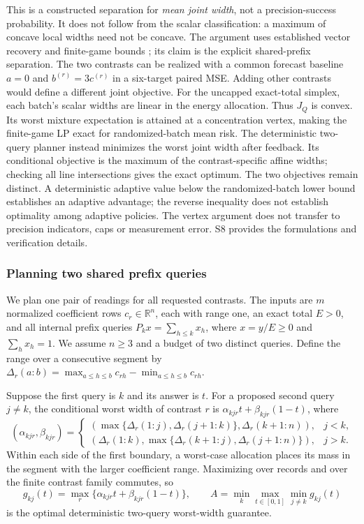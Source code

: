 \documentclass[12pt]{article}
\begin{document}
This is a constructed separation for \emph{mean joint width}, not a
precision-success probability.  It does not follow from the scalar
classification: a maximum of concave local widths need not be concave.
The argument uses established vector recovery and finite-game bounds
\citep{krieg2025}; its claim is the explicit shared-prefix separation.
The two contrasts can be realized with a common forecast baseline
$a=0$ and $b^{(r)}=3c^{(r)}$ in a six-target paired MSE.  Adding other
contrasts would define a different joint objective.
For the uncapped exact-total simplex, each batch's scalar widths are
linear in the energy allocation. Thus $J_Q$ is convex. Its worst mixture
expectation is attained at a concentration vertex, making the finite-game
LP exact for randomized-batch mean risk. The deterministic two-query
planner instead minimizes the worst joint width after feedback. Its
conditional objective is the maximum of the contrast-specific affine
widths; checking all line intersections gives the exact optimum.
The two objectives remain distinct. A deterministic adaptive value below
the randomized-batch lower bound establishes an adaptive advantage; the
reverse inequality does not establish optimality among adaptive policies.
The vertex argument does not transfer to precision indicators, caps or
measurement error. S8 provides the formulations and verification details.
\subsubsection{Planning two shared prefix queries}
\label{sec:shared-planner-algorithm}
We plan one pair of readings for all requested contrasts.  The inputs are
$m$ normalized coefficient rows $c_r\in\mathbb R^n$, each with range one,
an exact total $E>0$, and all internal prefix queries
$P_kx=\sum_{h\leq k}x_h$, where $x=y/E\geq0$ and $\sum_hx_h=1$.
We assume $n\geq3$ and a budget of two distinct queries.  Define the range
over a consecutive segment by
$\Delta_r(a{:}b)=\max_{a\leq h\leq b}c_{rh}-\min_{a\leq h\leq b}c_{rh}$.

Suppose the first query is $k$ and its answer is $t$.  For a proposed
second query $j\ne k$, the conditional worst width of contrast $r$ is
$\alpha_{kjr}t+\beta_{kjr}(1-t)$, where
\[
 (\alpha_{kjr},\beta_{kjr})=
 \begin{cases}
 (\max\{\Delta_r(1{:}j),\Delta_r(j+1{:}k)\},
             \Delta_r(k+1{:}n)),&j<k,\\
 (\Delta_r(1{:}k),
       \max\{\Delta_r(k+1{:}j),\Delta_r(j+1{:}n)\}),&j>k.
 \end{cases}
\]
Within each side of the first boundary, a worst-case allocation places
its mass in the segment with the larger coefficient range.  Maximizing
over records and over the finite contrast family commutes, so
\[
 g_{kj}(t)=\max_r\{\alpha_{kjr}t+\beta_{kjr}(1-t)\},\qquad
 A=\min_k\max_{t\in[0,1]}\min_{j\ne k}g_{kj}(t)
\]
is the optimal deterministic two-query worst-width guarantee.
\end{document}

